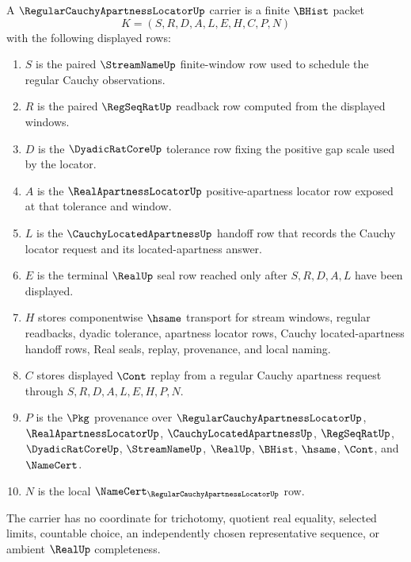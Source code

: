 \begin{definition}
\label{def:regular-cauchy-apartness-locator-carrier}
A $\RegularCauchyApartnessLocatorUp$ carrier is a finite $\BHist$ packet
$$
K=(S,R,D,A,L,E,H,C,P,N)
$$
with the following displayed rows:
\begin{enumerate}
\item $S$ is the paired $\StreamNameUp$ finite-window row used to schedule the regular Cauchy observations.
\item $R$ is the paired $\RegSeqRatUp$ readback row computed from the displayed windows.
\item $D$ is the $\DyadicRatCoreUp$ tolerance row fixing the positive gap scale used by the locator.
\item $A$ is the $\RealApartnessLocatorUp$ positive-apartness locator row exposed at that tolerance and window.
\item $L$ is the $\CauchyLocatedApartnessUp$ handoff row that records the Cauchy locator request and its located-apartness answer.
\item $E$ is the terminal $\RealUp$ seal row reached only after $S,R,D,A,L$ have been displayed.
\item $H$ stores componentwise $\hsame$ transport for stream windows, regular readbacks, dyadic tolerance, apartness locator rows, Cauchy located-apartness handoff rows, Real seals, replay, provenance, and local naming.
\item $C$ stores displayed $\Cont$ replay from a regular Cauchy apartness request through $S,R,D,A,L,E,H,P,N$.
\item $P$ is the $\Pkg$ provenance over $\RegularCauchyApartnessLocatorUp$, $\RealApartnessLocatorUp$, $\CauchyLocatedApartnessUp$, $\RegSeqRatUp$, $\DyadicRatCoreUp$, $\StreamNameUp$, $\RealUp$, $\BHist$, $\hsame$, $\Cont$, and $\NameCert$.
\item $N$ is the local $\NameCert_{\RegularCauchyApartnessLocatorUp}$ row.
\end{enumerate}
The carrier has no coordinate for trichotomy, quotient real equality, selected limits, countable choice, an independently chosen representative sequence, or ambient $\RealUp$ completeness.
\end{definition}

